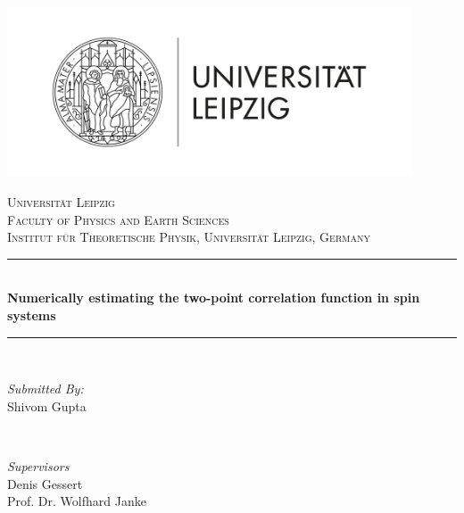 \begin{titlepage}
    \newcommand{\HRule}{\rule{\linewidth}{0.5mm}}
    \centering

	\includegraphics[width=0.9\textwidth]{images/logo.png}

    \textsc{\LARGE Universität Leipzig}\\[1.5cm]
    \textsc{\Large Faculty of Physics and Earth Sciences}\\[0.5cm]
    \textsc{\Large \small Institut f\"ur Theoretische Physik, Universit\"at Leipzig, Germany}\\[0.5cm]

    \HRule\\[0.4cm]
    {\huge\bfseries Numerically estimating the two-point correlation function in spin systems}\\[0.4cm]
    \HRule\\[1.5cm]

    \begin{minipage}{0.45\textwidth}
        \begin{flushleft} \large
            \textit{Submitted By:}\\
            Shivom Gupta
        \end{flushleft}
    \end{minipage}
    ~
    \begin{minipage}{0.45\textwidth}
        \begin{flushright} \large
            \textit{Supervisors}\\
            Denis Gessert\\
            Prof. Dr. Wolfhard Janke
        \end{flushright}
    \end{minipage}\\[2cm]

    \vfill
\end{titlepage}
